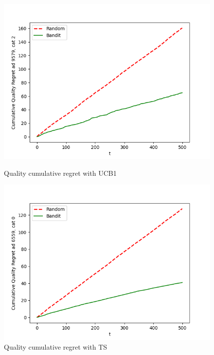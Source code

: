 \documentclass{article}
\begin{document}
\begin{figure}[H]

\begin{minipage}{0.48\textwidth}
\centering
\includegraphics[width=1\linewidth]{images/quality UCB1 15 arm 500 nodes 500 days 5 iterations.png}
\caption{Quality cumulative regret with UCB1}
\end{minipage}
\hfill
\begin{minipage}{0.48\textwidth}
\centering
\includegraphics[width=1\linewidth]{images/quality TS 15 arm 500 nodes 500 days 5 iterations.png}
\caption{Quality cumulative regret with TS}
\end{minipage}

\end{figure}
\end{document}
